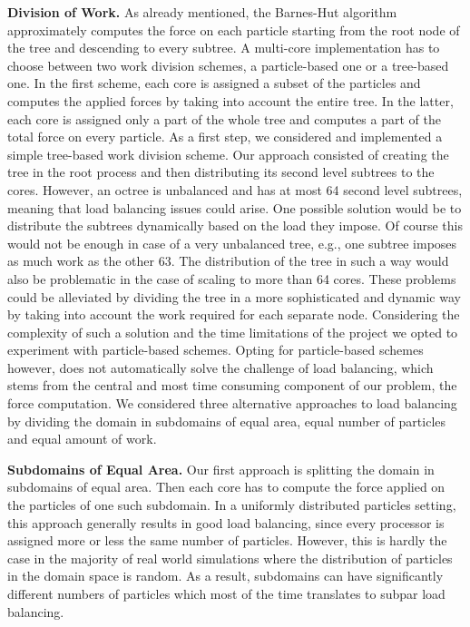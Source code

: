 \documentclass[letterpaper]{article}
\newcommand{\mypar}[1]{{\bf #1.}}
\begin{document}
\mypar{Division of Work} As already mentioned, the Barnes-Hut algorithm approximately computes the force on each particle starting from the root node of the tree and descending to every subtree. A multi-core implementation has to choose between two work division schemes, a particle-based one or a tree-based one. In the first scheme, each core is assigned a subset of the particles and computes the applied forces by taking into account the entire tree. In the latter, each core is assigned only a part of the whole tree and computes a part of the total force on every particle. \newline
\indent As a first step, we considered and implemented a simple tree-based work division scheme. Our approach consisted of creating the tree in the root process and then distributing its second level subtrees to the cores. However, an octree is unbalanced and has at most 64 second level subtrees, meaning that load balancing issues could arise. One possible solution would be to distribute the subtrees dynamically based on the load they impose. Of course this would not be enough in case of a very unbalanced tree, e.g., one subtree imposes as much work as the other 63. The distribution of the tree in such a way would also be problematic in the case of scaling to more than 64 cores. These problems could be alleviated by dividing the tree in a more sophisticated and dynamic way by taking into account the work required for each separate node. Considering the complexity of such a solution and the time limitations of the project we opted to experiment with particle-based schemes. \newline
\indent Opting for particle-based schemes however, does not automatically solve the challenge of load balancing, which stems from the central and most time consuming component of our problem, the force computation. We considered three alternative approaches to load balancing by dividing the domain in subdomains of equal area, equal number of particles and equal amount of work.

\mypar{Subdomains of Equal Area} Our first approach is splitting the domain in subdomains of equal area. Then each core has to compute the force applied on the particles of one such subdomain. \newline
\indent In a uniformly distributed particles setting, this approach generally results in good load balancing, since every processor is assigned more or less the same number of particles. However, this is hardly the case in the majority of real world simulations where the distribution of particles in the domain space is random. As a result, subdomains can have significantly different numbers of particles which most of the time translates to subpar load balancing.
\end{document}
